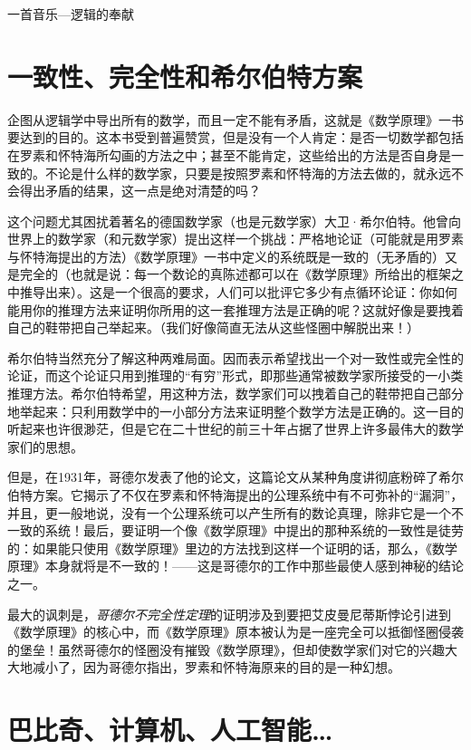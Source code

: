 \begin{intro}{一首音乐—逻辑的奉献}
\section{一致性、完全性和希尔伯特方案}

企图从逻辑学中导出所有的数学，而且一定不能有矛盾，这就是《数学原理》一书要达到的目的。这本书受到普遍赞赏，但是没有一个人肯定：是否一切数学都包括在罗素和怀特海所勾画的方法之中；甚至不能肯定，这些给出的方法是否自身是一致的。不论是什么样的数学家，只要是按照罗素和怀特海的方法去做的，就永远不会得出矛盾的结果，这一点是绝对清楚的吗？

这个问题尤其困扰着著名的德国数学家（也是元数学家）大卫·希尔伯特。他曾向世界上的数学家（和元数学家）提出这样一个挑战：严格地论证（可能就是用罗素与怀特海提出的方法）《数学原理》一书中定义的系统既是一致的（无矛盾的）又是完全的（也就是说：每一个数论的真陈述都可以在《数学原理》所给出的框架之中推导出来）。这是一个很高的要求，人们可以批评它多少有点循环论证：你如何能用你的推理方法来证明你所用的这一套推理方法是正确的呢？这就好像是要拽着自己的鞋带把自己举起来。（我们好像简直无法从这些怪圈中解脱出来！）

希尔伯特当然充分了解这种两难局面。因而表示希望找出一个对一致性或完全性的论证，而这个论证只用到推理的“有穷”形式，即那些通常被数学家所接受的一小类推理方法。希尔伯特希望，用这种方法，数学家们可以拽着自己的鞋带把自己部分地举起来：只利用数学中的一小部分方法来证明整个数学方法是正确的。这一目的听起来也许很渺茫，但是它在二十世纪的前三十年占据了世界上许多最伟大的数学家们的思想。

但是，在1931年，哥德尔发表了他的论文，这篇论文从某种角度讲彻底粉碎了希尔伯特方案。它揭示了不仅在罗素和怀特海提出的公理系统中有不可弥补的“漏洞”，并且，更一般地说，没有一个公理系统可以产生所有的数论真理，除非它是一个不一致的系统！最后，要证明一个像《数学原理》中提出的那种系统的一致性是徒劳的：如果能只使用《数学原理》里边的方法找到这样一个证明的话，那么，《数学原理》本身就将是不一致的！——这是哥德尔的工作中那些最使人感到神秘的结论之一。

最大的讽刺是，\emph{哥德尔不完全性定理}的证明涉及到要把艾皮曼尼蒂斯悖论引进到《数学原理》的核心中，而《数学原理》原本被认为是一座完全可以抵御怪圈侵袭的堡垒！虽然哥德尔的怪圈没有摧毁《数学原理》，但却使数学家们对它的兴趣大大地减小了，因为哥德尔指出，罗素和怀特海原来的目的是一种幻想。

\section{巴比奇、计算机、人工智能…}


\end{intro}
